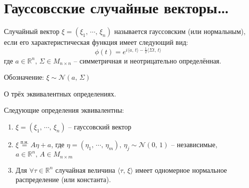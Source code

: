 \section{Гауссовсские случайные векторы\dots}
\begin{definition}
	Случайный вектор $\xi = (\xi_1,\,\cdots,\,\xi_n)$ называется гауссовским (или нормальным), если его характеристическая функция имеет следующий вид:
	\[\phi(t) = e^{i\langle a,\, t\rangle - \frac{1}{2}\langle\Sigma t,\, t\rangle}\]
	где $a \in \mathbb{R}^n,\, \Sigma \in M_{n \times n}$ -- симметричная и неотрицательно определённая.

	Обозначение: $\xi \sim \mathcal{N}(a,\, \Sigma)$
\end{definition}

\begin{theorem}
	О трёх эквивалентных определениях.

	Следующие определения эквивалентны:
	\begin{enumerate}
		\item $\xi = (\xi_1,\,\cdots,\,\xi_n)$ -- гауссовский вектор
		\item $\xi \stackrel{\text{п.н.}}{=} A\eta + a$, где $\eta = (\eta_1,\,\cdots,\,\eta_m),\, \eta_j \sim \mathcal{N}(0,\,1)$ -- независимые, $a \in \mathbb{R}^n,\, A \in M_{n \times m}$
		\item Для $\forall \tau \in \mathbb{R}^n$ случайная величина $\langle \tau,\, \xi\rangle$ имеет одномерное нормальное распределение (или константа).
	\end{enumerate}
\end{theorem}

